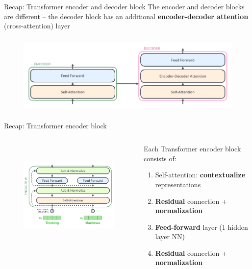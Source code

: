 \documentclass[12pt,aspectratio=169,handout]{beamer}
\begin{document}
\begin{frame}{Recap: Transformer encoder and decoder block}
	The encoder and decoder blocks are different -- the decoder block has an additional \textbf{encoder-decoder attention} (cross-attention) layer
	\begin{center}
		\begin{figure}[h]
			\includegraphics[height=4cm]{transformer_blocks}
		\end{figure}
	\end{center}
\end{frame}

\begin{frame}{Recap: Transformer encoder block}
\begin{columns}[T] %
	\begin{column}{.48\textwidth}
	\begin{center}
		\begin{figure}[h]
			\includegraphics[height=5.5cm]{transformer_residual_layer_norm}
		\end{figure}
	\end{center}
\end{column}

\begin{column}{.48\textwidth}
	Each Transformer encoder block consists of:
	\begin{enumerate}
		\item Self-attention: \textbf{contextualize} representations
		\item \textbf{Residual} connection + \textbf{normalization}
		\item \textbf{Feed-forward} layer ($1$ hidden layer NN)
		\item \textbf{Residual} connection + \textbf{normalization}
	\end{enumerate}
\end{column}
\end{columns}
\end{frame}
\end{document}
